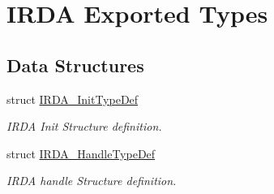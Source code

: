 \hypertarget{group___i_r_d_a___exported___types}{}\section{I\+R\+DA Exported Types}
\label{group___i_r_d_a___exported___types}
\subsection*{Data Structures}
\begin{DoxyCompactItemize}
\item 
struct \hyperlink{struct_i_r_d_a___init_type_def}{I\+R\+D\+A\+\_\+\+Init\+Type\+Def}
\begin{DoxyCompactList}\small\item\em I\+R\+DA Init Structure definition. \end{DoxyCompactList}\item 
struct \hyperlink{struct_i_r_d_a___handle_type_def}{I\+R\+D\+A\+\_\+\+Handle\+Type\+Def}
\begin{DoxyCompactList}\small\item\em I\+R\+DA handle Structure definition. \end{DoxyCompactList}\end{DoxyCompactItemize}
